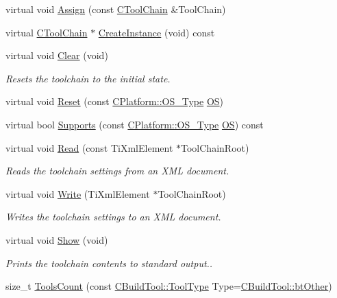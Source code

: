 \begin{DoxyCompactItemize}
\item 
virtual void \hyperlink{classCToolChain_a79b9c93c470439d3d6fb7409664d7704}{Assign} (const \hyperlink{classCToolChain}{C\-Tool\-Chain} \&Tool\-Chain)
\item 
virtual \hyperlink{classCToolChain}{C\-Tool\-Chain} $\ast$ \hyperlink{classCToolChain_aa6765d5197d898efb01d032ac73b7764}{Create\-Instance} (void) const 
\item 
virtual void \hyperlink{classCToolChain_af623550203ec26d297e9366abfa2462e}{Clear} (void)
\begin{DoxyCompactList}\small\item\em Resets the toolchain to the initial state. \end{DoxyCompactList}\item 
virtual void \hyperlink{classCToolChain_a3b48ddb23b898b3b6eaa356a2ed6fbf8}{Reset} (const \hyperlink{classCPlatform_a2fb735c63c53052f79629e338bb0f535}{C\-Platform\-::\-O\-S\-\_\-\-Type} \hyperlink{classCToolChain_abe4054d9081351e099163e2c53b260f8}{O\-S})
\item 
virtual bool \hyperlink{classCToolChain_a9e4b747dc5aa2e06e7e14c0f41970c16}{Supports} (const \hyperlink{classCPlatform_a2fb735c63c53052f79629e338bb0f535}{C\-Platform\-::\-O\-S\-\_\-\-Type} \hyperlink{classCToolChain_abe4054d9081351e099163e2c53b260f8}{O\-S}) const 
\item 
virtual void \hyperlink{classCToolChain_adcd4022b4155c9166c297c5109574d71}{Read} (const Ti\-Xml\-Element $\ast$Tool\-Chain\-Root)
\begin{DoxyCompactList}\small\item\em Reads the toolchain settings from an X\-M\-L document. \end{DoxyCompactList}\item 
virtual void \hyperlink{classCToolChain_a463cb9af1c861ee1524e98cbb638493d}{Write} (Ti\-Xml\-Element $\ast$Tool\-Chain\-Root)
\begin{DoxyCompactList}\small\item\em Writes the toolchain settings to an X\-M\-L document. \end{DoxyCompactList}\item 
virtual void \hyperlink{classCToolChain_aa173b49ddd8bde7ff18142821e667212}{Show} (void)
\begin{DoxyCompactList}\small\item\em Prints the toolchain contents to standard output.. \end{DoxyCompactList}\item 
size\-\_\-t \hyperlink{classCToolChain_a6d44d3281af9719ba887ccfb33456f32}{Tools\-Count} (const \hyperlink{classCBuildTool_a1a622843617ddf9b0ebb1c09c3437e6d}{C\-Build\-Tool\-::\-Tool\-Type} Type=\hyperlink{classCBuildTool_a1a622843617ddf9b0ebb1c09c3437e6dab1bafc4d8b635a113d8aa8df402db376}{C\-Build\-Tool\-::bt\-Other})

\end{DoxyCompactItemize}
